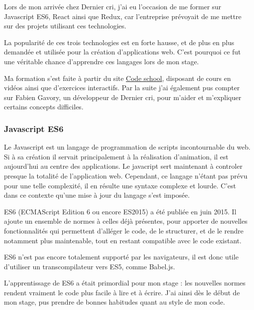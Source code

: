 \bigskip

Lors de mon arrivée chez Dernier cri, j'ai eu l'occasion de me former
sur Javascript ES6, React ainsi que Redux, car l'entreprise prévoyait de
me mettre sur des projets utilisant ces technologies.

\bigskip

La popularité de ces trois technologies est en forte hausse, et de plus
en plus demandée et utilisée pour la création d'applications web. C'est
pourquoi ce fut une véritable chance d'apprendre ces langages lors de
mon stage.

\bigskip

Ma formation s'est faite à partir du site
\href{https://www.codeschool.com/}{Code school}, disposant de cours en
vidéos ainsi que d'exercices interactifs. Par la suite j'ai également
pus compter sur Fabien Gavory, un développeur de Dernier cri, pour
m'aider et m'expliquer certains concepts difficiles.

\bigskip

\subsubsection{Javascript ES6}\label{javascript-es6}

\bigskip

Le Javascript est un langage de programmation de scripts incontournable
du web. Si à sa création il servait principalement à la réalisation
d'animation, il est aujourd'hui au centre des applications. Le javacript
sert maintenant à controler presque la totalité de l'application web.
Cependant, ce langage n'étant pas prévu pour une telle complexité, il en
résulte une syntaxe complexe et lourde. C'est dans ce contexte qu'une
mise à jour du langage s'est imposée.

\bigskip

ES6 (ECMAScript Edition 6 ou encore ES2015) a été publiée en juin 2015.
Il ajoute un ensemble de normes à celles déjà présentes, pour apporter
de nouvelles fonctionnalités qui permettent d'alléger le code, de le
structurer, et de le rendre notamment plus maintenable, tout en restant
compatible avec le code existant.

\bigskip

ES6 n'est pas encore totalement supporté par les navigateurs, il est
donc utile d'utiliser un transcompilateur vers ES5, comme Babel.js.

\bigskip

L'apprentissage de ES6 a était primordial pour mon stage : les nouvelles
normes rendent vraiment le code plus facile à lire et à écrire. J'ai
ainsi dès le début de mon stage, pus prendre de bonnes habitudes quant
au style de mon code.


